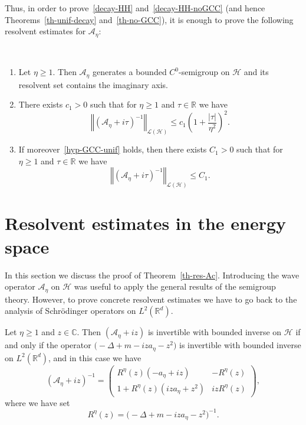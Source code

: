 \documentclass[AHL,Unicode,longabstracts]{cedram}
\newcommand{\abs}[1]{\left\vert #1\right\vert}
\newcommand{\nr}[1]{\left\Vert #1\right\Vert}
\renewcommand{\leq}{\leqslant}
\renewcommand{\geq}{\geqslant}
\newcommand{\inv}{^{-1}}
\newcommand{\1}{\mathds 1}
\newcommand{\R}{\mathbb{R}}
\newcommand{\D}{\Delta}
\renewcommand{\t}{\tau}
\newcommand{\Ac}{{\mathcal A}}
\newcommand{\Hc}{{\mathcal H}}
\newcommand{\Lc}{{\mathcal L}}
\newcommand{\HH}{\mathcal H}
\begin{document}
Thus, in order to prove~\eqref{decay-HH} and~\eqref{decay-HH-noGCC} (and hence Theorems~\ref{th-unif-decay} and~\ref{th-no-GCC}), it is enough to prove the following resolvent estimates for $\Ac_\eta$:

\let\oldpointir\pointir
\renewcommand{\pointir}{}
\begin{theo}\label{th-res-Ac}\ 
\begin{enumerate}%
\item Let $\eta \geq 1$. Then $\Ac_\eta$ generates a bounded $C^0$-semigroup on $\HH$ and its resolvent set contains the imaginary axis.
\item There exists $c_1 > 0$ such that for $\eta \geq 1$ and $\t \in \R$ we have
\[
\nr{(\Ac_\eta + i\tau)\inv}_{\Lc(\HH)} \leq c_1 \left(1+\frac {\abs{\t}}{\eta^2} \right)^2.
\]
\item If moreover~\eqref{hyp-GCC-unif} holds, then there exists $C_1 > 0$ such that for $\eta \geq 1$ and $\t \in \R$ we have
\[
\nr{(\Ac_\eta + i\tau)\inv}_{\Lc(\HH)} \leq C_1.
\]
\end{enumerate}
\end{theo}
\let\pointir\oldpointir

\section{Resolvent estimates in the energy space} \label{sec-res-from-L2-to-Hc}

In this section we discuss the proof of Theorem~\ref{th-res-Ac}. Introducing the wave operator $\Ac_\eta$ on $\HH$ was useful to apply the general results of the semigroup theory. However, to prove concrete resolvent estimates we have to go back to the analysis of Schr\"odinger operators on $L^2(\R^d)$.

\begin{prop}\label{prop-res-Ac-Rz}
Let $\eta \geq 1$ and $z \in \mathbb C$. Then $(\Ac_\eta +iz)$ is invertible with bounded inverse on $\Hc$ if and only if the operator $ {\big(-\D + m -iza_\eta -z^2\big)} $ is invertible with bounded inverse on $L^2(\R^d)$, and in this case we have
\begin{equation}\label{expr-res-Ac}
(\Ac_\eta +iz)\inv =
\begin{pmatrix}
R^\eta(z) (-a_\eta + iz) & -R^\eta(z) \\
1 + R^\eta(z) (iz a_\eta+z^2) & i z R^\eta(z)
\end{pmatrix},
\end{equation}
where we have set
\[
R^\eta(z) = \big(-\D + m -iza_\eta -z^2\big)\inv.
\]
\end{prop}
\end{document}
